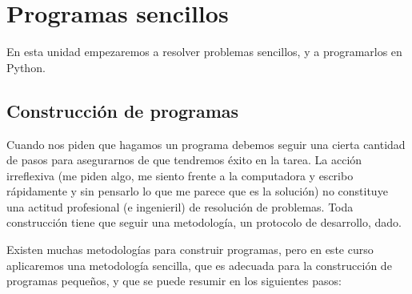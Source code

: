
%

\chapter[Programas sencillos]{Programas sencillos}

En esta unidad empezaremos a resolver problemas sencillos, y a
programarlos en Python.

\section{Construcción de programas}

Cuando nos piden que hagamos un programa debemos seguir una cierta
cantidad de pasos para asegurarnos de que tendremos éxito en la
tarea. La acción irreflexiva (me piden algo, me siento frente a la
computadora y escribo rápidamente y sin pensarlo lo que me parece
que es la solución) no constituye una actitud profesional (e
ingenieril) de resolución de problemas. Toda construcción tiene
que seguir una metodología, un protocolo de desarrollo, dado.

Existen muchas metodologías para construir programas, pero en este
curso aplicaremos una metodología sencilla, que es adecuada para
la construcción de programas pequeños, y que se puede resumir en
los siguientes pasos:

